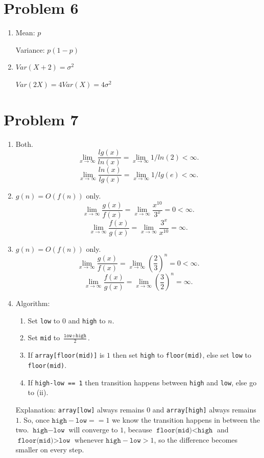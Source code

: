 \documentclass[11pt]{article}
\begin{document}
\section{Problem 6}
\begin{enumerate}
\item
  Mean: $p$
  
  Variance: $p(1-p)$
\item
  $Var(X+2) = \sigma^2$

  $Var(2X) = 4Var(X) = 4\sigma^2$
\end{enumerate}
\newpage
\section{Problem 7}
\begin{enumerate}
\item
  Both.
  \[\lim_{x \rightarrow \infty} \frac{lg(x)}{ln(x)} = \lim_{x \rightarrow \infty} 1/ln(2) < \infty.\]
  \[\lim_{x \rightarrow \infty} \frac{ln(x)}{lg(x)} = \lim_{x \rightarrow \infty} 1/lg(e) < \infty.\]
\item
  $g(n) = O(f(n))$ only.
  \[\lim_{x \rightarrow \infty} \frac{g(x)}{f(x)} = \lim_{x \rightarrow \infty} \frac{x^{10}}{3^x} = 0 < \infty.\]
  \[\lim_{x \rightarrow \infty} \frac{f(x)}{g(x)} = \lim_{x \rightarrow \infty} \frac{3^x}{x^{10}} = \infty.\]
\item
  $g(n) = O(f(n))$ only.
  \[\lim_{x \rightarrow \infty} \frac{g(x)}{f(x)} = \lim_{x \rightarrow \infty} \left(\frac{2}{3}\right)^n = 0 < \infty.\]
  \[\lim_{x \rightarrow \infty} \frac{f(x)}{g(x)} = \lim_{x \rightarrow \infty} \left(\frac{3}{2}\right)^n = \infty.\]

\item Algorithm:
  \begin{enumerate}
  \item Set \texttt{low} to $0$ and \texttt{high} to $n$.
  \item Set \texttt{mid} to $\frac{\texttt{low} + \texttt{high}}{2}$.
  \item If \texttt{array[floor(mid)]} is $1$ then set \texttt{high} to
    \texttt{floor(mid)},
    else set \texttt{low} to \texttt{floor(mid)}.
  \item If \texttt{high-low == 1} then transition happens between
    \texttt{high} and \texttt{low}, else go to (ii).
  \end{enumerate}
  Explanation: \texttt{array[low]} always remains $0$ and \texttt{array[high]}
  always remains $1$. So, once $\texttt{high} - \texttt{low} == 1$ we know the
  transition happens in between the two. $\texttt{high} - \texttt{low}$ will
  converge to $1$, because $\texttt{floor(mid)} < \texttt{high}$ and
  $\texttt{floor(mid)} > \texttt{low}$ whenever
  $\texttt{high} - \texttt{low} > 1$, so the difference becomes smaller on
  every step.
\end{enumerate}
\newpage
\end{document}
